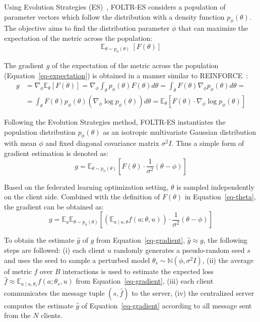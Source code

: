 Using Evolution Strategies (ES)~\cite{salimans2017evolution}, FOLTR-ES considers a population of parameter vectors which follow the distribution with a density function $p_{\phi}(\theta)$. The objective aims to find the distribution parameter $\phi$ that can maximize the expectation of the metric across the population:
\begin{equation}
	 \mathbb{E}_{\theta\sim p_{\phi}(\theta)}~[F(\theta)] \label{eq-expectation}
\end{equation}

The gradient $g$ of the expectation of the metric across the population (Equation~\ref{eq-expectation}) is obtained in a manner similar to REINFORCE~\cite{williams1992simple}:
\begin{equation}
	\begin{aligned}
		g &=\nabla_{\phi} \mathbb{E}_{\theta}[F(\theta)]=\nabla_{\phi} \int_{\theta} p_{\phi}(\theta) F(\theta) d \theta=\int_{\theta} F(\theta) \nabla_{\phi} p_{\phi}(\theta) d \theta=\\
		&=\int_{\theta} F(\theta) p_{\phi}(\theta)\left(\nabla_{\phi} \log p_{\phi}(\theta)\right) d \theta=\mathbb{E}_{\theta}\left[F(\theta) \cdot \nabla_{\phi} \log p_{\phi}(\theta)\right]
	\end{aligned}
\end{equation}

Following the Evolution Strategies method, FOLTR-ES instantiates the population distribution $p_{\phi}(\theta)$ as an isotropic multivariate Gaussian distribution with mean $\phi$ and fixed diagonal covariance matrix $\sigma^2I$. Thus a simple form of gradient estimation is denoted as:
\begin{equation}
	g=\mathbb{E}_{\theta \sim p_{\phi}(\theta)}\left[F(\theta) \cdot \frac{1}{\sigma^{2}}(\theta-\phi)\right]
\end{equation}

Based on the federated learning optimization setting, $\theta$ is sampled independently on the client side. Combined with the definition of $F(\theta)$ in Equation~\ref{eq-theta}, the gradient can be obtained as:
\begin{equation}
	g=\mathbb{E}_{u} \mathbb{E}_{\theta \sim p_{\phi}(\theta)}\left[\left(\mathbb{E}_{a \mid u, \theta} f(a ; \theta, u)\right) \cdot \frac{1}{\sigma^{2}}(\theta-\phi)\right] \label{eq-gradient}
\end{equation}

To obtain the estimate $\hat{g}$ of $g$ from Equation~\ref{eq-gradient}, $\hat{g} \approx g$, the following steps are followed: (i) each client $u$ randomly generates a pseudo-random seed $s$ and uses the seed to sample a perturbed model $\theta_{s} \sim \mathbb{N}\left(\phi, \sigma^{2} I\right)$, (ii) the average of metric $f$ over $B$ interactions is used to estimate the expected loss $\hat{f} \approx \mathbb{E}_{a \mid u, \theta_{s}} f(a;\theta_s, u) $ from Equation~\ref{eq-gradient}, (iii) each client communicates the message tuple $(s,\hat{f})$ to the server, (iv) the centralized server computes the estimate $\hat{g}$ of Equation~\ref{eq-gradient} according to all message sent from the $N$ clients.

